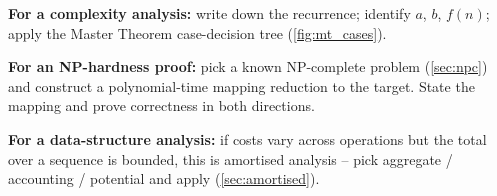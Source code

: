 \textbf{For a complexity analysis:} write down the recurrence; identify $a$, $b$, $f(n)$; apply the Master Theorem case-decision tree (\cref{fig:mt_cases}).

\textbf{For an NP-hardness proof:} pick a known NP-complete problem (\cref{sec:npc}) and construct a polynomial-time mapping reduction to the target. State the mapping and prove correctness in both directions.

\textbf{For a data-structure analysis:} if costs vary across operations but the total over a sequence is bounded, this is amortised analysis -- pick aggregate / accounting / potential and apply (\cref{sec:amortised}).
